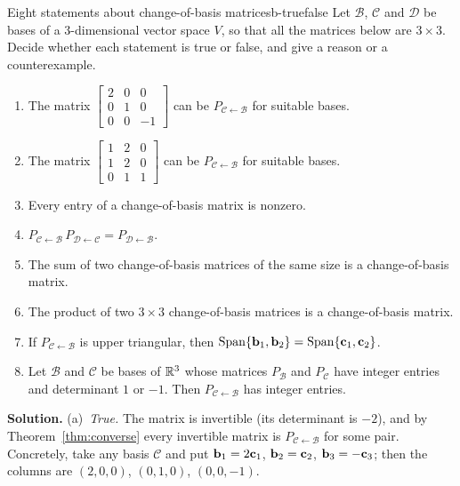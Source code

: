 \documentclass[11pt]{article}
\begin{document}
\begin{exmp}{Eight statements about change-of-basis matrices}{b-truefalse}
Let $\mathcal{B}$, $\mathcal{C}$ and $\mathcal{D}$ be bases of a $3$-dimensional vector space $V$, so that all the matrices below are $3\times3$. Decide whether each statement is true or false, and give a reason or a counterexample.
\begin{enumerate}
  \item[(a)] The matrix $\begin{bmatrix}2&0&0\\0&1&0\\0&0&-1\end{bmatrix}$ can be $P_{\mathcal{C}\leftarrow\mathcal{B}}$ for suitable bases.
  \item[(b)] The matrix $\begin{bmatrix}1&2&0\\1&2&0\\0&1&1\end{bmatrix}$ can be $P_{\mathcal{C}\leftarrow\mathcal{B}}$ for suitable bases.
  \item[(c)] Every entry of a change-of-basis matrix is nonzero.
  \item[(d)] $P_{\mathcal{C}\leftarrow\mathcal{B}}\,P_{\mathcal{D}\leftarrow\mathcal{C}}=P_{\mathcal{D}\leftarrow\mathcal{B}}$.
  \item[(e)] The sum of two change-of-basis matrices of the same size is a change-of-basis matrix.
  \item[(f)] The product of two $3\times3$ change-of-basis matrices is a change-of-basis matrix.
  \item[(g)] If $P_{\mathcal{C}\leftarrow\mathcal{B}}$ is upper triangular, then $\operatorname{Span}\{\mathbf{b}_1,\mathbf{b}_2\}=\operatorname{Span}\{\mathbf{c}_1,\mathbf{c}_2\}$.
  \item[(h)] Let $\mathcal{B}$ and $\mathcal{C}$ be bases of $\mathbb{R}^3$ whose matrices $P_{\mathcal{B}}$ and $P_{\mathcal{C}}$ have integer entries and determinant $1$ or $-1$. Then $P_{\mathcal{C}\leftarrow\mathcal{B}}$ has integer entries.
\end{enumerate}

\textbf{Solution.}
(a)~\emph{True.} The matrix is invertible (its determinant is $-2$), and by Theorem~\ref{thm:converse} every invertible matrix is $P_{\mathcal{C}\leftarrow\mathcal{B}}$ for some pair. Concretely, take any basis $\mathcal{C}$ and put $\mathbf{b}_1=2\mathbf{c}_1$, $\mathbf{b}_2=\mathbf{c}_2$, $\mathbf{b}_3=-\mathbf{c}_3$; then the columns are $(2,0,0)$, $(0,1,0)$, $(0,0,-1)$.


\end{exmp}
\end{document}
